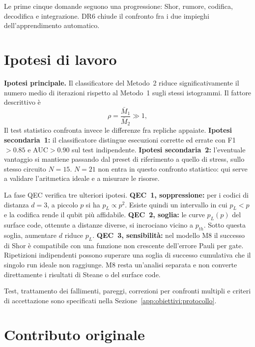 \begin{onehalfspace}
Le prime cinque domande seguono una progressione: Shor, rumore, codifica,
decodifica e integrazione. DR6 chiude il confronto fra i due impieghi
dell'apprendimento automatico.

\section{Ipotesi di lavoro}
\label{sec:ipotesi}

\textbf{Ipotesi principale.} Il classificatore del Metodo~2 riduce significativamente il numero medio di iterazioni rispetto al Metodo~1 sugli stessi istogrammi. Il fattore descrittivo è
\begin{equation}
    \rho=\frac{\bar{M}_1}{\bar{M}_2}\gg1,
    \label{eq:fattore_riduzione}
\end{equation}
Il test statistico confronta invece le differenze fra repliche appaiate.
\textbf{Ipotesi secondaria~1:} il classificatore distingue esecuzioni corrette ed errate con F1$>0.85$ e AUC$>0.90$ sul test indipendente.
\textbf{Ipotesi secondaria~2:} l'eventuale vantaggio si mantiene passando dal preset di riferimento a quello di stress, sullo stesso circuito $N=15$. $N=21$ non entra in questo confronto statistico: qui serve a validare l'aritmetica ideale e a misurare le risorse.

La fase QEC verifica tre ulteriori ipotesi.
\textbf{QEC~1, soppressione:} per i codici di distanza $d=3$, a piccolo $p$ si ha $p_L\propto p^2$. Esiste quindi un intervallo in cui $p_L<p$ e la codifica rende il qubit più affidabile.
\textbf{QEC~2, soglia:} le curve $p_L(p)$ del surface code, ottenute a distanze diverse, si incrociano vicino a $p_{th}$. Sotto questa soglia, aumentare $d$ riduce $p_L$.
\textbf{QEC~3, sensibilità:} nel modello M8 il successo di Shor è compatibile con una funzione non crescente dell'errore Pauli per gate. Ripetizioni indipendenti possono superare una soglia di successo cumulativa che il singolo run ideale non raggiunge. M8 resta un'analisi separata e non converte direttamente i risultati di Steane o del surface code.

Test, trattamento dei fallimenti, pareggi, correzioni per confronti multipli e criteri di accettazione sono specificati nella Sezione~\ref{app:obiettivi:protocollo}.

\section{Contributo originale}
\label{sec:contributo_originale}


\end{onehalfspace}
